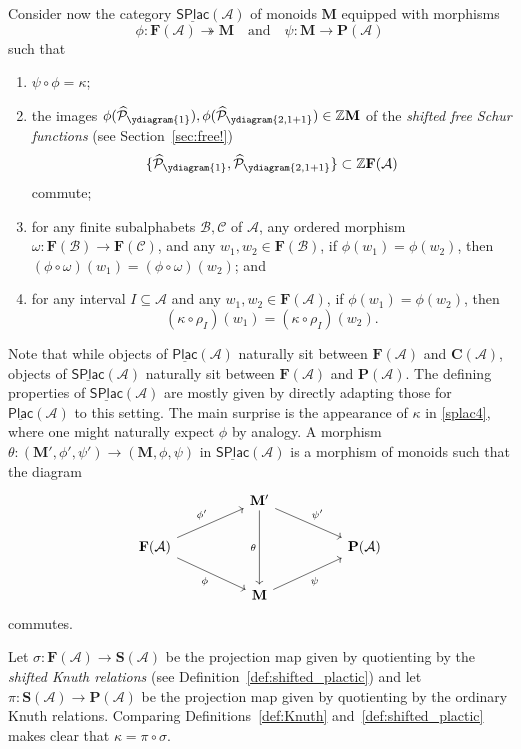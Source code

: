 \documentclass[12 pt]{amsart}
\newcommand{\Z}{\mathbb{Z}}
\newcommand{\Plactic}{{\mathbf{P}}}
\newcommand{\Free}{\mathbf{F}}
\newcommand{\sPlactic}{\mathbf{S}}
\newcommand{\Monoid}{\mathbf{M}}
\newcommand{\Abelian}{\mathbf{C}}
\newcommand{\Category}{\underline{\mathsf{SPlac}}}
\newcommand{\LSCategory}{\underline{\mathsf{Plac}}}
\newcommand{\sFreeSchur}{\widehat{\mathcal{P}}}
\newcommand{\cA}{\mathcal{A}}
\newcommand{\cB}{\mathcal{B}}
\newcommand{\cC}{\mathcal{C}}
\theoremstyle{remark}
\numberwithin{equation}{section}
\begin{document}
\bigskip
Consider now the category $\Category(\cA)$ of monoids $\Monoid$ equipped with morphisms 
\[\phi : \Free(\cA) \twoheadrightarrow \Monoid \quad \text{and} \quad \psi : \Monoid \to \Plactic(\cA)
\]such that 
\begin{enumerate}[label=\textrm{(SPlac.\arabic*)}]
    \item $\psi \circ \phi = \kappa$; \label{splac1}
    \item {} the images $\phi(\sFreeSchur_{\ydiagram{1}}), \phi(\sFreeSchur_{\ydiagram{2,1+1}}) \in \Z\Monoid$ of the \emph{shifted free Schur functions} (see Section~\ref{sec:free!})
    \[
    \{ \sFreeSchur_{\ydiagram{1}}, \sFreeSchur_{\ydiagram{2,1+1}} \} \subset \Z\Free(\cA)
    \]
    commute; \label{splac2}
    \item for any finite subalphabets $\cB, \cC$ of $\cA$, any ordered morphism $\omega : \Free(\cB) \to \Free(\cC)$, and any $w_1, w_2 \in \Free(\cB)$, if $\phi(w_1) = \phi(w_2)$, then $(\phi \circ \omega)(w_1) = (\phi \circ \omega)(w_2)$; and \label{splac3}
    \item for any interval $I \subseteq \cA$ and any $w_1, w_2 \in \Free(\cA)$, if $\phi(w_1) = \phi(w_2)$, then \[(\kappa \circ \rho_I)(w_1) = (\kappa \circ \rho_I)(w_2).\] \label{splac4}
\end{enumerate}
Note that while objects of $\LSCategory(\cA)$ naturally sit between $\Free(\cA)$ and $\Abelian(\cA)$, objects of $\Category(\cA)$ naturally sit between $\Free(\cA)$ and $\Plactic(\cA)$. The defining properties of $\Category(\cA)$ are mostly given by directly adapting those for $\LSCategory(\cA)$ to this setting. The main surprise is the appearance of $\kappa$ in \ref{splac4}, where one might naturally expect $\phi$ by analogy.
A morphism $\theta : (\Monoid', \phi', \psi') \to (\Monoid, \phi, \psi)$ in $\Category(\cA)$ is a morphism of monoids such that the diagram
\begin{equation}
 \label{eq:shifted_rhombus}
\begin{tikzcd}[column sep=huge]
& \Monoid' \ar[dr, "\psi'"] \ar[dd,"\theta"'] 
& \\
\Free(\cA) \ar[ur, "\phi'"] \ar[dr, "\phi"']
&
& \Plactic(\cA) \\
& \Monoid \ar[ur, "\psi"']
&
\end{tikzcd}
\end{equation}
commutes.

Let $\sigma : \Free(\cA) \to \sPlactic(\cA)$ be the projection map given by quotienting by the \emph{shifted Knuth relations} (see Definition~\ref{def:shifted_plactic}) and let $\pi : \sPlactic(\cA) \to \Plactic(\cA)$ be the projection map given by quotienting by the ordinary Knuth relations. Comparing Definitions~\ref{def:Knuth} and~\ref{def:shifted_plactic} makes clear that $\kappa = \pi \circ \sigma$. 
\end{document}
